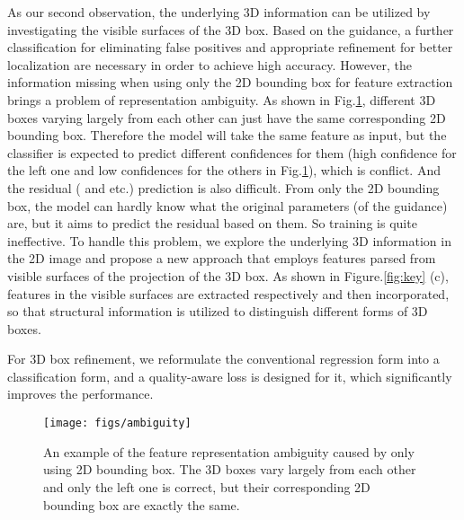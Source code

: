 \documentclass[10pt,twocolumn,letterpaper]{article}
\begin{document}
As our second observation, the underlying 3D information can be utilized by investigating the visible surfaces of the 3D box.
Based on the guidance, a further classification for eliminating false positives and appropriate refinement for better localization are necessary in order to achieve high accuracy. 
However, the information missing when using only the 2D bounding box for feature extraction brings a problem of representation ambiguity.
As shown in Fig.\ref{fig:ambiguity}, different 3D boxes varying largely from each other can just have the same corresponding 2D bounding box. Therefore the model will take the same feature as input, but the classifier is expected to predict different confidences for them (high confidence for the left one and low confidences for the others in Fig.\ref{fig:ambiguity}), which is conflict.
And the residual ( and etc.) prediction is also difficult. From only the 2D bounding box, the model can hardly know what the original parameters (of the guidance) are, but it aims to predict the residual based on them. So training is quite ineffective.
To handle this problem, we explore the underlying 3D information in the 2D image and propose a new approach that employs features parsed from visible surfaces of the projection of the 3D box. As shown in Figure.\ref{fig:key} (c), features in the visible surfaces are extracted respectively and then incorporated, so that structural information is utilized to distinguish different forms of 3D boxes.

For 3D box refinement, we reformulate the conventional regression form into a classification form, and a quality-aware loss is designed for it, which significantly improves the performance.


\begin{figure}[!t]
\centering
\texttt{[image: figs/ambiguity]}
\caption{An example of the feature representation ambiguity caused by only using 2D bounding box. The 3D boxes vary largely from each other and only the left one is correct, but their corresponding 2D bounding box are exactly the same.}
\label{fig:ambiguity}
\end{figure}
\end{document}
